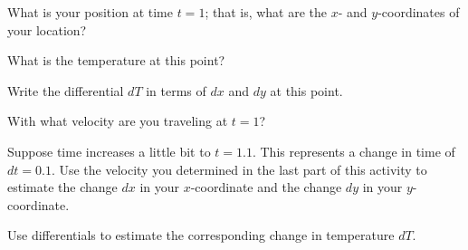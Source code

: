 \begin{pa}
  \ba
\item What is your position at time $t=1$;  that is, what are the $x$-
  and $y$-coordinates of your location?
\item What is the temperature at this point?
\item Write the differential $dT$ in terms of $dx$ and $dy$ at this
  point. 
\item With what velocity are you traveling at $t=1$?
\item Suppose time increases a little bit to $t=1.1$.  This
  represents a change in time of $dt=0.1$.  Use the velocity you
  determined in the last part of this activity to estimate the change
  $dx$ in your $x$-coordinate and the change $dy$ in your
  $y$-coordinate.
\item Use differentials to estimate the corresponding change in
  temperature $dT$.

  \ea

\end{pa} 
\afterpa 